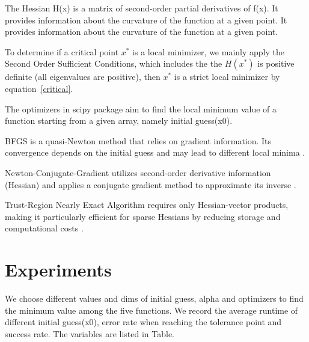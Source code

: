 \documentclass[12pt]{article}
\begin{document}
The Hessian H(x) is a matrix of second-order partial derivatives of f(x). It provides information about the curvature of the function at a given point. It provides information about the curvature of the function at a given point.

To determine if a critical point $x^*$ is a local minimizer, we mainly apply the Second Order Sufficient Conditions, which includes the the $H(x^*)$ is positive definite (all eigenvalues are positive), then $x^*$ is a strict local minimizer by equation~\ref{critical}.

The optimizers in scipy package aim to find the local minimum value of a function starting from a given array, namely initial guess(x0).  \cite{scipy} 

BFGS is a quasi-Newton method that relies on gradient information. Its convergence depends on the initial guess and may lead to different local minima \cite{scipybfgs}.

Newton-Conjugate-Gradient utilizes second-order derivative information (Hessian) and applies a conjugate gradient method to approximate its inverse \cite{scipynewton}.

Trust-Region Nearly Exact Algorithm requires only Hessian-vector products, making it particularly efficient for sparse Hessians by reducing storage and computational costs \cite{scipytrust}.

\section{Experiments}


We choose different values and dims of initial guess, alpha and optimizers to find the minimum value among the five functions. We record the average runtime of different initial guess(x0), error rate when reaching the tolerance point and success rate. The variables are listed in Table. %

\begin{table}[h!]
\label{table:rule}
\centering
\caption{Variants for experiment setups; x0 means the initial guess}
\end{table}
\end{document}
